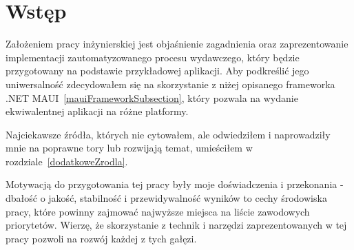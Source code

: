 \section{Wstęp}

Założeniem pracy inżynierskiej jest objaśnienie zagadnienia oraz zaprezentowanie implementacji zautomatyzowanego procesu wydawczego, 
który będzie przygotowany na podstawie przykładowej aplikacji. 
Aby podkreślić jego uniwersalność zdecydowałem się na skorzystanie z niżej opisanego frameworka .NET MAUI~\ref{mauiFrameworkSubsection}, 
który pozwala na wydanie ekwiwalentnej aplikacji na różne platformy.

Najciekawsze źródła, których nie cytowałem, ale odwiedziłem i naprowadziły mnie na poprawne tory lub rozwijają temat, 
umieściłem w rozdziale~\ref{dodatkoweZrodla}.

Motywacją do przygotowania tej pracy były moje doświadczenia i przekonania - 
dbałość o jakość, stabilność i przewidywalność wyników to cechy środowiska pracy, 
które powinny zajmować najwyższe miejsca na liście zawodowych priorytetów.
Wierzę, że skorzystanie z technik i narzędzi zaprezentowanych w tej pracy 
pozwoli na rozwój każdej z tych gałęzi.

